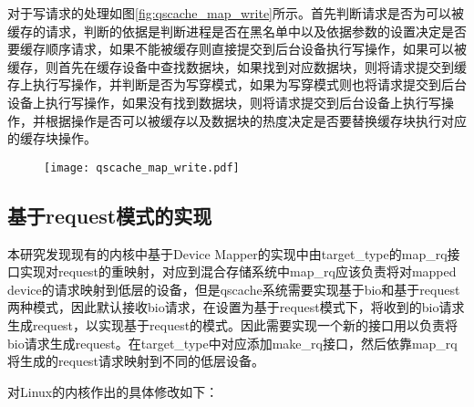 对于写请求的处理如图\ref{fig:qscache_map_write}所示。首先判断请求是否为可以被缓存的请求，判断的依据是判断进程是否在黑名单中以及依据参数的设置决定是否要缓存顺序请求，如果不能被缓存则直接提交到后台设备执行写操作，如果可以被缓存，则首先在缓存设备中查找数据块，如果找到对应数据块，则将请求提交到缓存上执行写操作，并判断是否为写穿模式，如果为写穿模式则也将请求提交到后台设备上执行写操作，如果没有找到数据块，则将请求提交到后台设备上执行写操作，并根据操作是否可以被缓存以及数据块的热度决定是否要替换缓存块执行对应的缓存块操作。

\begin{figure}[!htbp]
    \centering
    \texttt{[image: qscache\_map\_write.pdf]}
\end{figure}

\subsection{基于request模式的实现}

本研究发现现有的内核中基于Device Mapper的实现中由target\_type的map\_rq接口实现对request的重映射，对应到混合存储系统中map\_rq应该负责将对mapped device的请求映射到低层的设备，但是qscache系统需要实现基于bio和基于request两种模式，因此默认接收bio请求，在设置为基于request模式下，将收到的bio请求生成request，以实现基于request的模式。因此需要实现一个新的接口用以负责将bio请求生成request。在target\_type中对应添加make\_rq接口，然后依靠map\_rq将生成的request请求映射到不同的低层设备。

对Linux的内核作出的具体修改如下：

